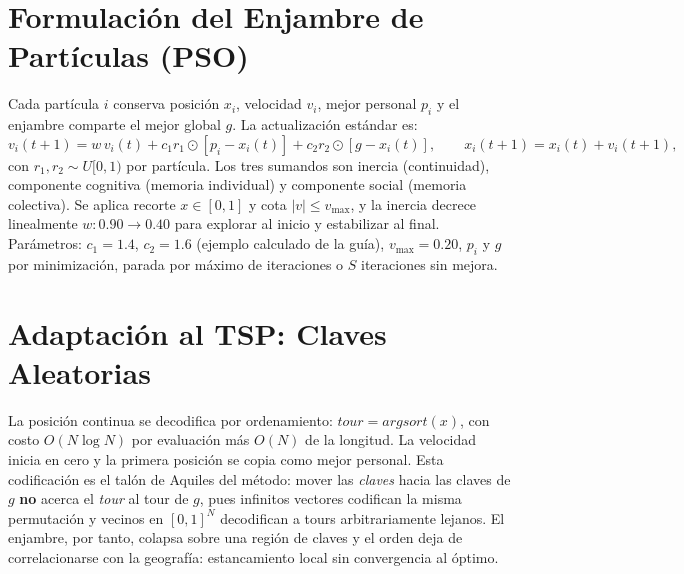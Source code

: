 \documentclass[11pt,a4paper]{article}
\begin{document}
\section{Formulación del Enjambre de Partículas (PSO)}
Cada partícula $i$ conserva posición $x_i$, velocidad $v_i$, mejor personal $p_i$ y el enjambre comparte el mejor global $g$. La actualización estándar es:
\begin{equation}
    v_i(t+1) = w\,v_i(t) + c_1r_1\odot[p_i - x_i(t)] + c_2r_2\odot[g - x_i(t)], \qquad x_i(t+1) = x_i(t) + v_i(t+1),
\end{equation}
con $r_1, r_2 \sim U[0,1)$ por partícula. Los tres sumandos son inercia (continuidad), componente cognitiva (memoria individual) y componente social (memoria colectiva). Se aplica recorte $x \in [0,1]$ y cota $|v| \le v_{\max}$, y la inercia decrece linealmente $w:0{.}90\to0{.}40$ para explorar al inicio y estabilizar al final. Parámetros: $c_1=1{.}4$, $c_2=1{.}6$ (ejemplo calculado de la guía), $v_{\max}=0{.}20$, $p_i$ y $g$ por minimización, parada por máximo de iteraciones o $S$ iteraciones sin mejora.

\section{Adaptación al TSP: Claves Aleatorias}
La posición continua se decodifica por ordenamiento: $tour = argsort(x)$, con costo $O(N\log N)$ por evaluación más $O(N)$ de la longitud. La velocidad inicia en cero y la primera posición se copia como mejor personal. Esta codificación es el talón de Aquiles del método: mover las \textit{claves} hacia las claves de $g$ \textbf{no} acerca el \textit{tour} al tour de $g$, pues infinitos vectores codifican la misma permutación y vecinos en $[0,1]^N$ decodifican a tours arbitrariamente lejanos. El enjambre, por tanto, colapsa sobre una región de claves y el orden deja de correlacionarse con la geografía: estancamiento local sin convergencia al óptimo.

\end{document}
